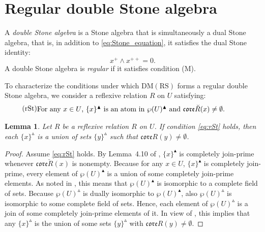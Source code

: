 \documentclass[11pt,a4paper]{amsart}
\newcommand{\UP}{\blacktriangle}
\newcommand{\Up}{\vartriangle}
\theoremstyle{plain}
\newtheorem{lemma}[theorem]{Lemma}
\theoremstyle{definition}
\theoremstyle{remark}
\numberwithin{equation}{section}
\begin{document}
 

\section{Regular double Stone algebra}
\label{sec:regular_double_Stone}

A \emph{double Stone algebra} is a Stone algebra that is simultaneously a dual 
Stone algebra, that is, in addition to \eqref{eq:Stone_equation}, it satisfies the dual Stone identity:
\begin{equation} \label{eq:dual_Stone}
x^+ \wedge x^{++} = 0.
\end{equation}
A double Stone algebra is \emph{regular} if it satisfies condition (M).

To characterize the conditions under which $\mathrm{DM(RS)}$
forms a regular double Stone algebra, we consider a reflexive relation $R$ on $U$ satisfying:
\begin{equation} \tag{rSt} \label{eq:rSt}
\begin{minipage}[c]{0.9\textwidth}
 For any $x \in U$, $\{x\}^{\UP}$ is an atom in $\wp(U)^\UP$ and $\mathfrak{core}\breve{R}(x) \neq \emptyset$.
\end{minipage}
\end{equation}

\begin{lemma} \label{lem:rSt_implies}
Let $R$ be a reflexive relation $R$ on $U$.
If condition \eqref{eq:rSt} holds, then each
$\{x\}^\Up$ is a union of sets
$\{y\}^\Up$ such that $\mathfrak{core}R(y) \neq \emptyset$. 
\end{lemma}

\begin{proof} Assume \eqref{eq:rSt} holds. By Lemma~4.10 of \cite{JarRad25}, 
$\{x\}^\UP$ is completely join-prime 
whenever $\mathfrak{core}\breve{R}(x)$ is nonempty. 
Because for any $x \in U$, $\{x\}^\UP$ is completely join-prime,
every element of $\wp(U)^\UP$ is a union of some completely join-prime elements.
As noted in \cite{JarRad25}, this means that $\wp(U)^\UP$ 
is isomorphic to a complete field of sets.
Because $\wp(U)^\Up$ is dually isomorphic to $\wp(U)^\UP$, also
$\wp(U)^\Up$ is isomorphic to some complete field of sets. 
Hence, each element of $\wp(U)^\Up$ is a join of some completely 
join-prime elements of it. 
In view of \cite[Lemma~4.10]{JarRad25}, this implies that any 
$\{x\}^\Up$ is the union of some sets $\{y\}^\Up$ with 
$\mathfrak{core}R(y) \neq \emptyset$. 
\end{proof}
\end{document}
